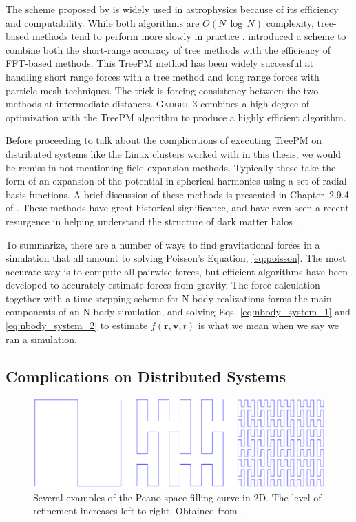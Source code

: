 The scheme proposed by \citet{barnes_hut} is widely used in astrophysics because of its efficiency and computability. While both algorithms are $O(N\,\log\, N)$ complexity, tree-based methods tend to perform more slowly in practice \citep{GadgetCodePaper}. \citet{xu_treepm} introduced a scheme to combine both the short-range accuracy of tree methods with the efficiency of FFT-based methods. This TreePM method has been widely successful at handling short range forces with a tree method and long range forces with particle mesh techniques. The trick is forcing consistency between the two methods at intermediate distances. \textsc{Gadget-3} combines a high degree of optimization with the TreePM algorithm to produce a highly efficient algorithm.

Before proceeding to talk about the complications of executing TreePM on distributed systems like the Linux clusters worked with in this thesis, we would be remiss in not mentioning field expansion methods. Typically these take the form of an expansion of the potential in spherical harmonics using a set of radial basis functions. A brief discussion of these methods is presented in Chapter~2.9.4 of \citet{BT}. These methods have great historical significance, and have even seen a recent resurgence in helping understand the structure of dark matter halos \citep{lilley_2018_a, lilley_2018_b}.

To summarize, there are a number of ways to find gravitational forces in a simulation that all amount to solving Poisson's Equation, \eqref{eq:poisson}. The most accurate way is to compute all pairwise forces, but efficient algorithms have been developed to accurately estimate forces from gravity. The force calculation together with a time stepping scheme for N-body realizations forms the main components of an N-body simulation, and solving Eqs. \eqref{eq:nbody_system_1} and \eqref{eq:nbody_system_2} to estimate $f(\textbf{r},\textbf{v},t)$ is what we mean when we say we ran a simulation.

\subsection{Complications on Distributed Systems}

\begin{figure}
	\centering
	\includegraphics[width=\textwidth]{../figures/Peanocurve.eps}
	\caption{Several examples of the Peano space filling curve in 2D. The level of refinement increases left-to-right. Obtained from \citet{peano}.}\label{fig:peano}
\end{figure}

